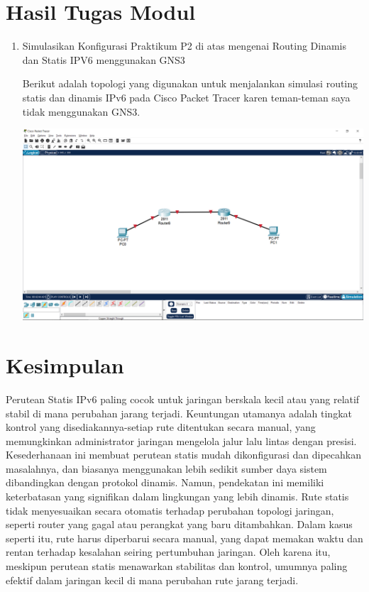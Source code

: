 \section{Hasil Tugas Modul}
\begin{enumerate}
    \item Simulasikan Konfigurasi Praktikum P2 di atas mengenai Routing Dinamis dan Statis IPV6 menggunakan GNS3

    Berikut adalah topologi yang digunakan untuk menjalankan 
    simulasi routing statis dan dinamis IPv6 pada Cisco Packet 
    Tracer karen teman-teman saya tidak menggunakan GNS3.

    \includegraphics[scale=0.17]{P1/img/19.png}
\end{enumerate}
\section{Kesimpulan}
Perutean Statis IPv6 paling cocok untuk jaringan berskala kecil 
atau yang relatif stabil di mana perubahan jarang terjadi. 
Keuntungan utamanya adalah tingkat kontrol yang 
disediakannya-setiap rute ditentukan secara manual, yang 
memungkinkan administrator jaringan mengelola jalur lalu lintas 
dengan presisi. Kesederhanaan ini membuat perutean statis mudah 
dikonfigurasi dan dipecahkan masalahnya, dan biasanya 
menggunakan lebih sedikit sumber daya sistem dibandingkan dengan 
protokol dinamis. Namun, pendekatan ini memiliki keterbatasan 
yang signifikan dalam lingkungan yang lebih dinamis. Rute statis 
tidak menyesuaikan secara otomatis terhadap perubahan topologi 
jaringan, seperti router yang gagal atau perangkat yang baru 
ditambahkan. Dalam kasus seperti itu, rute harus diperbarui 
secara manual, yang dapat memakan waktu dan rentan terhadap 
kesalahan seiring pertumbuhan jaringan. Oleh karena itu, 
meskipun perutean statis menawarkan stabilitas dan kontrol, 
umumnya paling efektif dalam jaringan kecil di mana perubahan 
rute jarang terjadi.

